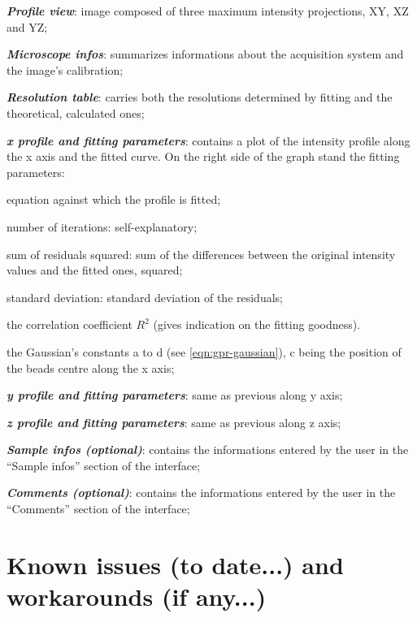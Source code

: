 \documentclass[a4paper, 11pt]{report}%
\begin{document}
\begin{itemize*}
	\item \textbf{\textit{Profile view}}: image composed of three maximum intensity projections, XY, XZ and YZ;
	\item \textbf{\textit{Microscope infos}}: summarizes informations about the acquisition system and the image's calibration;
	\item \textbf{\textit{Resolution table}}: carries both the resolutions determined by fitting and the theoretical, calculated ones;
	\item \textbf{\textit{x profile and fitting parameters}}: contains a plot of the intensity profile along the x axis and the fitted curve. On the right side of the graph stand the fitting parameters:
		\begin{itemize*}
			\item equation against which the profile is fitted;
			\item number of iterations: self-explanatory;
			\item sum of residuals squared: sum of the differences between the original intensity values and the fitted ones, squared;
			\item standard deviation: standard deviation of the residuals;
			\item the correlation coefficient $R^{2}$ (gives indication on the fitting goodness).
			\item the Gaussian's constants a to d (see \ref{eqn:gpr-gaussian}), c being the position of the beads centre along the x axis;	
		\end{itemize*}
	\item \textbf{\textit{y profile and fitting parameters}}: same as previous along y axis;
	\item \textbf{\textit{z profile and fitting parameters}}: same as previous along z axis;
	\item \textbf{\textit{Sample infos (optional)}}: contains the informations entered by the user in the ``Sample infos'' section of the interface;
	\item \textbf{\textit{Comments (optional)}}: contains the informations entered by the user in the ``Comments'' section of the interface;
\end{itemize*}

\section{Known issues (to date...) and workarounds (if any...)}
\label{sec:gpr-ki}
\end{document}
